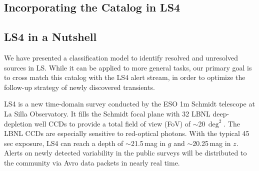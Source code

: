 \documentclass[twocolumn,tighten]{aastex631}
\begin{document}
\begin{CJK*}{UTF8}{gbsn}
\section{Incorporating the Catalog in LS4}\label{sec:pipeline}
\subsection{LS4 in a Nutshell}
We have presented a classification model to identify resolved and unresolved sources in LS. While it can be applied to more general tasks, our primary goal is to cross match this catalog with the LS4 alert stream, in order to optimize the follow-up strategy of newly discovered transients.

LS4 \citep{LS4_2025} is a new time-domain survey conducted by the ESO 1m Schmidt telescope at La Silla Observatory. It fills the Schmidt focal plane with 32 LBNL deep-depletion well CCDs to provide a total field of view (FoV) of $\sim$20\,$\deg^2$. The LBNL CCDs are especially sensitive to red-optical photons. With the typical 45\,sec exposure, LS4 can reach a depth of $\sim$21.5\,mag in $g$ and $\sim$20.25\,mag in $z$. 
Alerts on newly detected variability in the public surveys will be distributed to the community via Avro data packets in nearly real time.


\end{CJK*}
\end{document}
